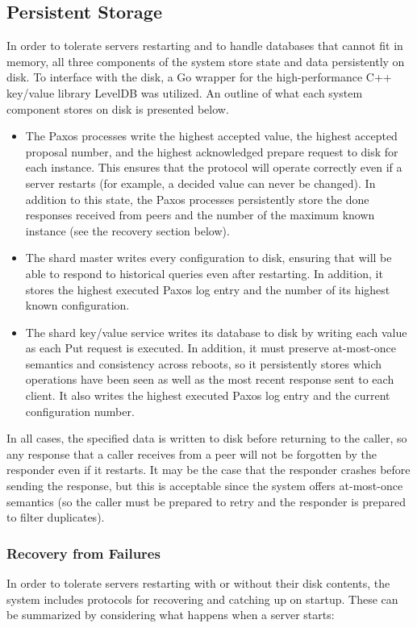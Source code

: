 \documentclass[letterpaper,10pt]{article}
\begin{document}
\subsection{Persistent Storage}
In order to tolerate servers restarting and to handle databases that
cannot fit in memory, all three components of the system store state
and data persistently on disk.  To interface with the disk, a Go
wrapper for the high-performance C++ key/value library LevelDB was
utilized.  An outline of what each system component stores on disk is
presented below.
\begin{itemize}
\item The Paxos processes write the highest accepted value, the
  highest accepted proposal number, and the highest acknowledged
  prepare request to disk for each instance.  This ensures that the
  protocol will operate correctly even if a server restarts \cite{paxos} (for
  example, a decided value can never be changed).  In addition to this
  state, the Paxos processes persistently store the done responses
  received from peers and the number of the maximum known instance
  (see the recovery section below).

\item The shard master writes every configuration to disk, ensuring
  that will be able to respond to historical queries even after
  restarting.  In addition, it stores the highest executed Paxos log
  entry and the number of its highest known configuration.

\item The shard key/value service writes its database to disk by
  writing each value as each Put request is executed.  In addition, it
  must preserve at-most-once semantics and consistency across reboots,
  so it persistently stores which operations have been seen as well as
  the most recent response sent to each client.  It also writes the
  highest executed Paxos log entry and the current configuration
  number.
\end{itemize}

In all cases, the specified data is written to disk before returning
to the caller, so any response that a caller receives from a peer will
not be forgotten by the responder even if it restarts.  It may be the
case that the responder crashes before sending the response, but this
is acceptable since the system offers at-most-once semantics (so the
caller must be prepared to retry and the responder is prepared to
filter duplicates).

\subsubsection{Recovery from Failures}
In order to tolerate servers restarting with or without their disk
contents, the system includes protocols for recovering and catching up
on startup.  These can be summarized by considering what happens when
a server starts:
\end{document}
